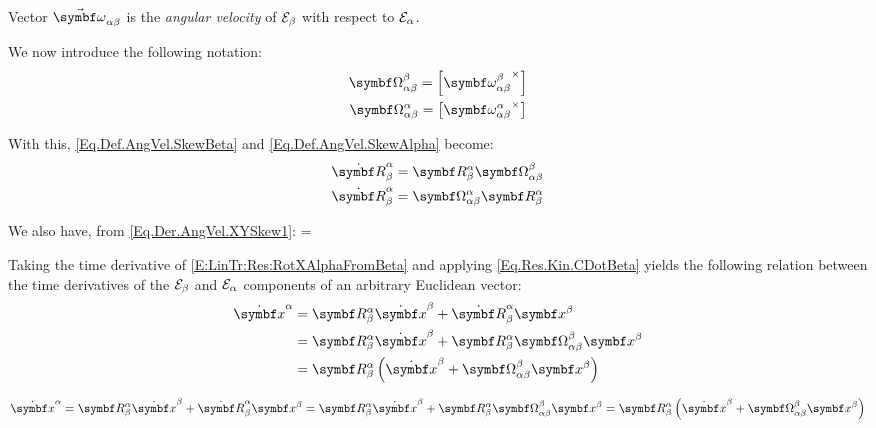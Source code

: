 Vector $\varel{\angvelsymb}{\alpha}{\beta}$ is the \emph{angular velocity} of $\basis[\beta]$ with respect to $\basis[\alpha]$.

We now introduce the following notation:
\begin{gather}
\AngVelSkew{\alpha}{\beta}{\beta} = \vskew{\angvel{\alpha}{\beta}{\beta}} \label{E:Rot:Def:AngVelSkewMatBeta}\\
\AngVelSkew{\alpha}{\beta}{\alpha} = \vskew{\angvel{\alpha}{\beta}{\alpha}} \label{E:Rot:Def:AngVelSkewMatAlpha}
\end{gather}

With this, \eqref{Eq.Def.AngVel.SkewBeta} and \eqref{Eq.Def.AngVel.SkewAlpha} become:
\begin{gather}
\RotMDot{\alpha}{\beta} = \RotM{\alpha}{\beta} \AngVelSkew{\alpha}{\beta}{\beta} \label{Eq.Res.Kin.CDotBeta}\\
\RotMDot{\alpha}{\beta} = \AngVelSkew{\alpha}{\beta}{\alpha} \RotM{\alpha}{\beta}\label{Eq.Res.Kin.CDotAlpha}
\end{gather}

We also have, from \eqref{Eq.Der.AngVel.XYSkew1}:
{
\AngVelSkew{\alpha}{\beta}{\alpha} = \RotM{\alpha}{\beta} \AngVelSkew{\alpha}{\beta}{\beta} \trp{\RotM{\alpha}{\beta}}
}

Taking the time derivative of \eqref{E:LinTr:Res:RotXAlphaFromBeta} and applying \eqref{Eq.Res.Kin.CDotBeta} yields the following relation between the time derivatives of the $\basis[\beta]$ and $\basis[\alpha]$ components of an arbitrary Euclidean vector:
\begin{equation} \label{Eq.Res.Coriolis}
\begin{split}
\vprjdot{x}{\alpha}&=  \RotM{\alpha}{\beta} \vprjdot{x}{\beta} + \RotMDot{\alpha}{\beta} \vprj{x}{\beta} \\
			&= \RotM{\alpha}{\beta} \vprjdot{x}{\beta} + \RotM{\alpha}{\beta} \AngVelSkew{\alpha}{\beta}{\beta} \vprj{x}{\beta} \\
			&= \RotM{\alpha}{\beta} \rndp{\prj{\dot{\mcol{x}}}{\beta} + \AngVelSkew{\alpha}{\beta}{\beta} \vprj{x}{\beta}}
\end{split}
\end{equation}

\begin{equation*}
\vprjdot{x}{\alpha} =  \RotM{\alpha}{\beta} \vprjdot{x}{\beta} + \RotMDot{\alpha}{\beta} \vprj{x}{\beta} = \RotM{\alpha}{\beta} \vprjdot{x}{\beta} + \RotM{\alpha}{\beta} \AngVelSkew{\alpha}{\beta}{\beta} \vprj{x}{\beta} = \RotM{\alpha}{\beta} \rndp{\prj{\dot{\mcol{x}}}{\beta} + \AngVelSkew{\alpha}{\beta}{\beta} \vprj{x}{\beta}}
\end{equation*}

